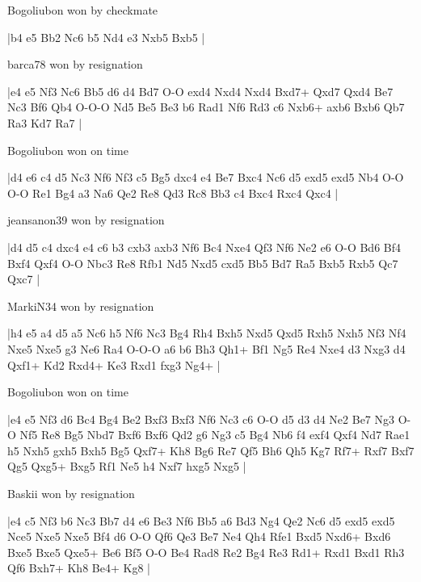 Bogoliubon won by checkmate

\makegametitle
|b4 e5 Bb2 Nc6 b5 Nd4 e3 Nxb5 Bxb5  |

\showboard

barca78 won by resignation

\makegametitle
|e4 e5 Nf3 Nc6 Bb5 d6 d4 Bd7 O-O exd4 Nxd4 Nxd4 Bxd7+ Qxd7 Qxd4 Be7 Nc3 Bf6 Qb4 O-O-O Nd5 Be5 Be3 b6 Rad1 Nf6 Rd3 c6 Nxb6+ axb6 Bxb6 Qb7 Ra3 Kd7 Ra7  |

\showboard

Bogoliubon won on time

\makegametitle
|d4 e6 c4 d5 Nc3 Nf6 Nf3 c5 Bg5 dxc4 e4 Be7 Bxc4 Nc6 d5 exd5 exd5 Nb4 O-O O-O Re1 Bg4 a3 Na6 Qe2 Re8 Qd3 Rc8 Bb3 c4 Bxc4 Rxc4 Qxc4  |

\showboard

jeansanon39 won by resignation

\makegametitle
|d4 d5 c4 dxc4 e4 c6 b3 cxb3 axb3 Nf6 Bc4 Nxe4 Qf3 Nf6 Ne2 e6 O-O Bd6 Bf4 Bxf4 Qxf4 O-O Nbc3 Re8 Rfb1 Nd5 Nxd5 cxd5 Bb5 Bd7 Ra5 Bxb5 Rxb5 Qc7 Qxc7  |

\showboard

MarkiN34 won by resignation

\makegametitle
|h4 e5 a4 d5 a5 Nc6 h5 Nf6 Nc3 Bg4 Rh4 Bxh5 Nxd5 Qxd5 Rxh5 Nxh5 Nf3 Nf4 Nxe5 Nxe5 g3 Ne6 Ra4 O-O-O a6 b6 Bh3 Qh1+ Bf1 Ng5 Re4 Nxe4 d3 Nxg3 d4 Qxf1+ Kd2 Rxd4+ Ke3 Rxd1 fxg3 Ng4+  |

\showboard

Bogoliubon won on time

\makegametitle
|e4 e5 Nf3 d6 Bc4 Bg4 Be2 Bxf3 Bxf3 Nf6 Nc3 c6 O-O d5 d3 d4 Ne2 Be7 Ng3 O-O Nf5 Re8 Bg5 Nbd7 Bxf6 Bxf6 Qd2 g6 Ng3 c5 Bg4 Nb6 f4 exf4 Qxf4 Nd7 Rae1 h5 Nxh5 gxh5 Bxh5 Bg5 Qxf7+ Kh8 Bg6 Re7 Qf5 Bh6 Qh5 Kg7 Rf7+ Rxf7 Bxf7 Qg5 Qxg5+ Bxg5 Rf1 Ne5 h4 Nxf7 hxg5 Nxg5  |

\showboard

Baskii won by resignation

\makegametitle
|e4 c5 Nf3 b6 Nc3 Bb7 d4 e6 Be3 Nf6 Bb5 a6 Bd3 Ng4 Qe2 Nc6 d5 exd5 exd5 Nce5 Nxe5 Nxe5 Bf4 d6 O-O Qf6 Qe3 Be7 Ne4 Qh4 Rfe1 Bxd5 Nxd6+ Bxd6 Bxe5 Bxe5 Qxe5+ Be6 Bf5 O-O Be4 Rad8 Re2 Bg4 Re3 Rd1+ Rxd1 Bxd1 Rh3 Qf6 Bxh7+ Kh8 Be4+ Kg8  |

